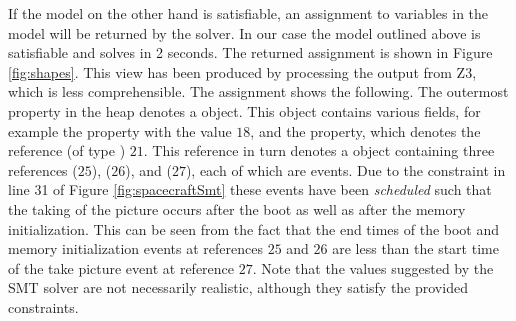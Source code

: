 If the model on the other hand is satisfiable, an assignment to
variables in the model will be returned by the solver. In our case the
model outlined above is satisfiable and solves in 2 seconds.  The
returned assignment is shown in Figure \ref{fig:shapes}. This view has
been produced by processing the output from Z3, which is less
comprehensible.
%
The assignment shows the following. The outermost 
property in the heap denotes a  object.  This object
contains various fields, for example the  property with
the value $18$, and the  property, which denotes the
reference (of type ) $21$. This reference in turn denotes a
 object containing three references 
($25$),  ($26$), and  ($27$), each of
which are events. Due to the constraint in line 31 of Figure
\ref{fig:spacecraftSmt} these events have been {\em scheduled} such
that the taking of the picture occurs after the boot as well as after
the memory initialization.  This can be seen from the fact that the
end times of the boot and memory initialization events at references
$25$ and $26$ are less than the start time of the take picture event
at reference $27$. Note that the values suggested by the SMT solver 
are not necessarily realistic, although they satisfy the provided
constraints.

\lstset{language=K}
